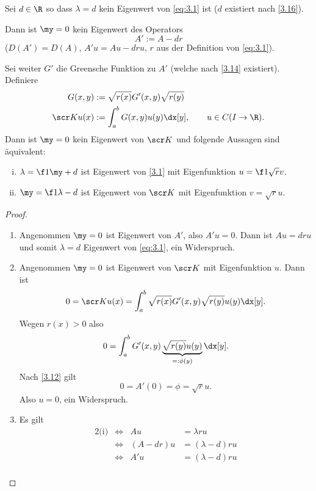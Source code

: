 \begin{st} \label{3.17}
	Sei $d\in \R$ so dass $\lambda = d$ kein Eigenwert von \eqref{eq:3.1} ist ($d$ existiert nach \ref{3.16}).

	Dann ist $\my = 0$ kein Eigenwert des Operators
	\[
		A' := A - dr
	\]
	($D(A') = D(A)$, $A'u = Au - dru$, $r$ aus der Definition von \eqref{eq:3.1}).

	Sei weiter $G'$ die Greensche Funktion zu $A'$ (welche nach \ref{3.14} existiert).
	Definiere
	\begin{align*}
		G(x,y) &:= \sqrt {r(x)} G'(x,y) \sqrt{r(y)} \\
		\scr K u(x) &:= \int_a^b G(x,y) u(y) \dx[y],  \qquad \text{$u\in C(I\to \R)$}.
	\end{align*}
	Dann ist $\my = 0$ kein Eigenwert von $\scr K$ und folgende Aussagen sind äquivalent:
	\begin{enumerate}[(i)]
		\item
			$\lambda = \f 1\my + d$ ist Eigenwert von \eqref{3.1} mit Eigenfunktion $u=\f 1{\sqrt r} v$.
		\item
			$\my = \f 1{\lambda -d}$ ist Eigenwert von $\scr K$ mit Eigenfunktion $v = \sqrt{r} u$.
	\end{enumerate}
	\begin{proof}
		\begin{enumerate}[1)]
			\item
				Angenommen $\my = 0$ ist Eigenwert von $A'$, also $A'u = 0$.
				Dann ist $Au = dru$ und somit $\lambda = d$ Eigenwert von \eqref{eq:3.1}, ein Widerspruch.
			\item
				Angenommen $\my = 0$ ist Eigenwert von $\scr K$ mit Eigenfunktion $u$.
				Dann ist
				\begin{align*}
					0 = \scr K u(x) = \int_a^b \sqrt{r(x)} G'(x,y) \sqrt{r(y)} u(y) \dx[y].
				\end{align*}
				Wegen $r(x) > 0$ also
				\begin{align*}
					0 = \int_a^b G'(x,y) \underbrace{\sqrt{r(y)} u(y)}_{=:\phi(y)} \dx[y].
				\end{align*}
				Nach \ref{3.12} gilt
				\[
					0 = A'(0) = \phi = \sqrt{r} u.
				\]
				Also $u = 0$, ein Widerspruch.
			\item
				Es gilt
				\begin{alignat*}{2}
					\text{(i)} &\iff& Au &= \lambda ru \\
					&\iff& (A-dr)u &= (\lambda - d)ru \\
					&\iff& A' u &= (\lambda -d)ru \\

\end{alignat*}
\end{enumerate}
\end{proof}
\end{st}
